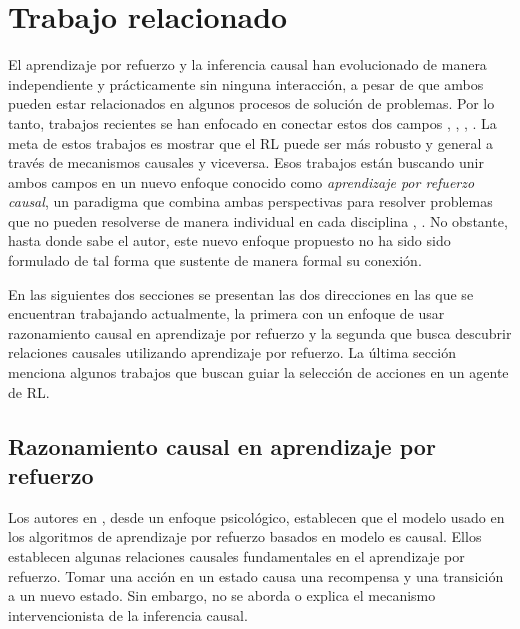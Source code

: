 \chapter{Trabajo relacionado}

\graphicspath{{Chapter3/Figs/}}


El aprendizaje por refuerzo y la inferencia
causal han evolucionado de manera 
independiente y prácticamente sin 
ninguna interacción, a pesar de que ambos
pueden estar relacionados en algunos
procesos de solución de problemas.
Por lo tanto, trabajos recientes
se han enfocado en conectar estos dos
campos  \cite{Gershman2017, 6-DBLP:journals/midm/YuDLR19}, \cite{6-DBLP:journals/midm/YuDLR19}, \cite{lu2018deconfounding}, \cite{dasgupta2019causal}. La meta de estos trabajos es mostrar que el RL puede ser más robusto y general a través de mecanismos
causales y viceversa.
Esos trabajos están buscando unir ambos
campos en un nuevo enfoque conocido como
\textit{aprendizaje por refuerzo causal}, un paradigma que combina
ambas perspectivas para resolver problemas que no pueden
resolverse de manera individual en cada disciplina \cite{CausalRL2019EliasB}, \cite{chaochao_2019}.
No obstante, hasta donde sabe el autor, 
este nuevo enfoque propuesto no ha sido 
sido formulado de tal forma que sustente de manera formal su conexión.


En las siguientes dos secciones se presentan las dos direcciones 
en las que se encuentran trabajando actualmente, la primera con
un enfoque de usar razonamiento causal en aprendizaje por refuerzo
y la segunda que busca descubrir relaciones causales utilizando
aprendizaje por refuerzo.
La última sección menciona algunos trabajos que buscan guiar la
selección de acciones en un agente de RL.

\section{Razonamiento causal en aprendizaje por refuerzo}


Los autores en \cite{Gershman2017}, desde un enfoque psicológico, establecen que
el modelo usado en los algoritmos de aprendizaje por refuerzo basados en modelo
es causal.
Ellos establecen algunas relaciones causales fundamentales en el aprendizaje por
refuerzo. Tomar una acción en un estado causa una recompensa y una 
transición a un nuevo estado.
Sin embargo, no se aborda o explica el mecanismo intervencionista de la inferencia causal.

